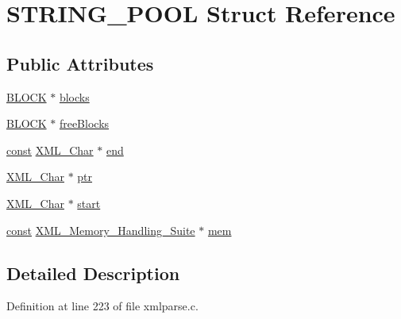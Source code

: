 \hypertarget{struct_s_t_r_i_n_g___p_o_o_l}{}\section{S\+T\+R\+I\+N\+G\+\_\+\+P\+O\+OL Struct Reference}
\label{struct_s_t_r_i_n_g___p_o_o_l}
\subsection*{Public Attributes}
\begin{DoxyCompactItemize}
\item 
\hyperlink{xmlparse_8c_a36711bca7556a427bbb3cf0f49620956}{B\+L\+O\+CK} $\ast$ \hyperlink{struct_s_t_r_i_n_g___p_o_o_l_a2749a1cd489203ac4bd3b4fbc7381e6e}{blocks}
\item 
\hyperlink{xmlparse_8c_a36711bca7556a427bbb3cf0f49620956}{B\+L\+O\+CK} $\ast$ \hyperlink{struct_s_t_r_i_n_g___p_o_o_l_a7b4dbf3b86fb43e042972b153be00727}{free\+Blocks}
\item 
\hyperlink{getopt1_8c_a2c212835823e3c54a8ab6d95c652660e}{const} \hyperlink{amiga_2include_2libraries_2expat_8h_a63da96463e775e1ec3a7d1f076208127}{X\+M\+L\+\_\+\+Char} $\ast$ \hyperlink{struct_s_t_r_i_n_g___p_o_o_l_a0046b4cdb4af2e088deaface848b4308}{end}
\item 
\hyperlink{amiga_2include_2libraries_2expat_8h_a63da96463e775e1ec3a7d1f076208127}{X\+M\+L\+\_\+\+Char} $\ast$ \hyperlink{struct_s_t_r_i_n_g___p_o_o_l_a975adff9721f6fb66e590c1b8edeb87b}{ptr}
\item 
\hyperlink{amiga_2include_2libraries_2expat_8h_a63da96463e775e1ec3a7d1f076208127}{X\+M\+L\+\_\+\+Char} $\ast$ \hyperlink{struct_s_t_r_i_n_g___p_o_o_l_aa62e883e0c4361ea3ce1c44eaa4aeea4}{start}
\item 
\hyperlink{getopt1_8c_a2c212835823e3c54a8ab6d95c652660e}{const} \hyperlink{struct_x_m_l___memory___handling___suite}{X\+M\+L\+\_\+\+Memory\+\_\+\+Handling\+\_\+\+Suite} $\ast$ \hyperlink{struct_s_t_r_i_n_g___p_o_o_l_aae511e75e1be26340f854a07a2dc928a}{mem}
\end{DoxyCompactItemize}


\subsection{Detailed Description}


Definition at line 223 of file xmlparse.\+c.



